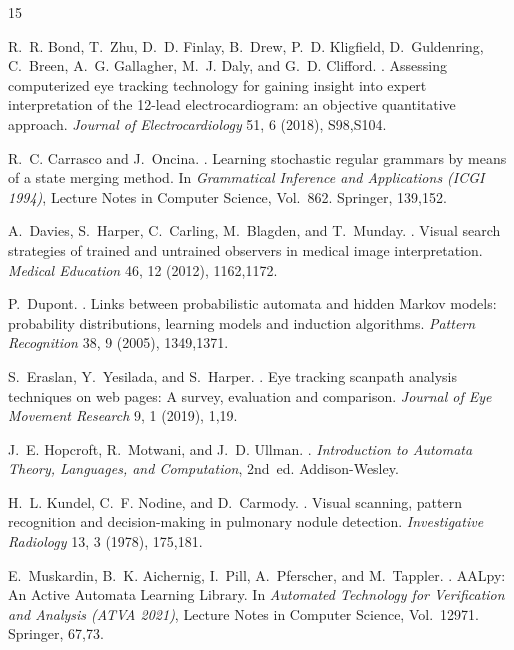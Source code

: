 \documentclass[sigconf]{acmart}
\theoremstyle{plain}
\theoremstyle{definition}
\begin{document}
\begin{thebibliography}{15}

R.~R. Bond, T.~Zhu, D.~D. Finlay, B.~Drew, P.~D. Kligfield, D.~Guldenring, C.~Breen,
A.~G. Gallagher, M.~J. Daly, and G.~D. Clifford.
.
\newblock Assessing computerized eye tracking technology for gaining insight into expert interpretation of the 12-lead electrocardiogram: an objective quantitative approach.
\newblock \emph{Journal of Electrocardiology} 51, 6 (2018), S98,S104.

R.~C. Carrasco and J.~Oncina.
.
\newblock Learning stochastic regular grammars by means of a state merging method.
\newblock In \emph{Grammatical Inference and Applications (ICGI 1994)}, Lecture Notes in Computer Science, Vol.~862. Springer, 139,152.

A.~Davies, S.~Harper, C.~Carling, M.~Blagden, and T.~Munday.
.
\newblock Visual search strategies of trained and untrained observers in medical image interpretation.
\newblock \emph{Medical Education} 46, 12 (2012), 1162,1172.

P.~Dupont.
.
\newblock Links between probabilistic automata and hidden Markov models: probability distributions, learning models and induction algorithms.
\newblock \emph{Pattern Recognition} 38, 9 (2005), 1349,1371.

S.~Eraslan, Y.~Yesilada, and S.~Harper.
.
\newblock Eye tracking scanpath analysis techniques on web pages: A survey, evaluation and comparison.
\newblock \emph{Journal of Eye Movement Research} 9, 1 (2019), 1,19.

J.~E. Hopcroft, R.~Motwani, and J.~D. Ullman.
.
\newblock \emph{Introduction to Automata Theory, Languages, and Computation}, 2nd~ed.
\newblock Addison-Wesley.

H.~L. Kundel, C.~F. Nodine, and D.~Carmody.
.
\newblock Visual scanning, pattern recognition and decision-making in pulmonary nodule detection.
\newblock \emph{Investigative Radiology} 13, 3 (1978), 175,181.

E.~Muskardin, B.~K. Aichernig, I.~Pill, A.~Pferscher, and M.~Tappler.
.
\newblock AALpy: An Active Automata Learning Library.
\newblock In \emph{Automated Technology for Verification and Analysis (ATVA 2021)}, Lecture Notes in Computer Science, Vol.~12971. Springer, 67,73.


\end{thebibliography}
\end{document}
